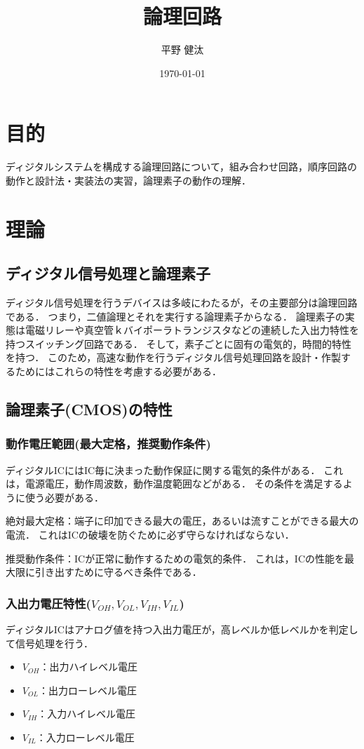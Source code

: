 \documentclass{ltjsarticle}
\begin{document}
\title{論理回路}
\author{平野 健汰}
\date{\today}

\maketitle

\section{目的}
ディジタルシステムを構成する論理回路について，組み合わせ回路，順序回路の動作と設計法・実装法の実習，論理素子の動作の理解．

\section{理論}
\subsection{ディジタル信号処理と論理素子}
ディジタル信号処理を行うデバイスは多岐にわたるが，その主要部分は論理回路である．
つまり，二値論理とそれを実行する論理素子からなる．
論理素子の実態は電磁リレーや真空管ｋバイポーラトランジスタなどの連続した入出力特性を持つスイッチング回路である．
そして，素子ごとに固有の電気的，時間的特性を持つ．
このため，高速な動作を行うディジタル信号処理回路を設計・作製するためにはこれらの特性を考慮する必要がある．

\subsection{論理素子(CMOS)の特性}
\subsubsection{動作電圧範囲(最大定格，推奨動作条件)}
ディジタルICにはIC毎に決まった動作保証に関する電気的条件がある．
これは，電源電圧，動作周波数，動作温度範囲などがある．
その条件を満足するように使う必要がある．

\noindent 絶対最大定格：端子に印加できる最大の電圧，あるいは流すことができる最大の電流．
これはICの破壊を防ぐために必ず守らなければならない．

\noindent 推奨動作条件：ICが正常に動作するための電気的条件．
これは，ICの性能を最大限に引き出すために守るべき条件である．

\subsubsection{入出力電圧特性(${V_{OH}, V_{OL}, V_{IH}, V_{IL}}$)}
ディジタルICはアナログ値を持つ入出力電圧が，高レベルか低レベルかを判定して信号処理を行う．
\begin{itemize}
  \item ${V_{OH}}$：出力ハイレベル電圧
  \item ${V_{OL}}$：出力ローレベル電圧
  \item ${V_{IH}}$：入力ハイレベル電圧
  \item ${V_{IL}}$：入力ローレベル電圧
\end{itemize}
\end{document}
